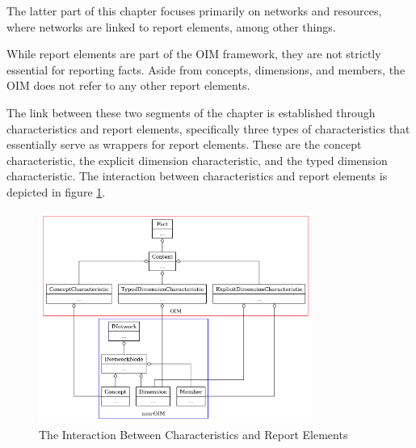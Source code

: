 The latter part of this chapter focuses primarily on networks and resources, where networks are linked to report elements, among other things.

While report elements are part of the OIM framework, they are not strictly essential for reporting facts. 
Aside from concepts, dimensions, and members, the OIM does not refer to any other report elements.

The link between these two segments of the chapter is established through characteristics and report elements, 
specifically three types of characteristics that essentially serve as wrappers for report elements. 
These are the concept characteristic, the explicit dimension characteristic, and the typed dimension characteristic. 
The interaction between characteristics and report elements is depicted in figure \ref{fig:brel_combine_api}.

\begin{figure}[H]
    \centering
    \includegraphics[width=0.8\textwidth]{images/brel_combine_api.png}
    \caption{The Interaction Between Characteristics and Report Elements}
    \label{fig:brel_combine_api}
\end{figure}


